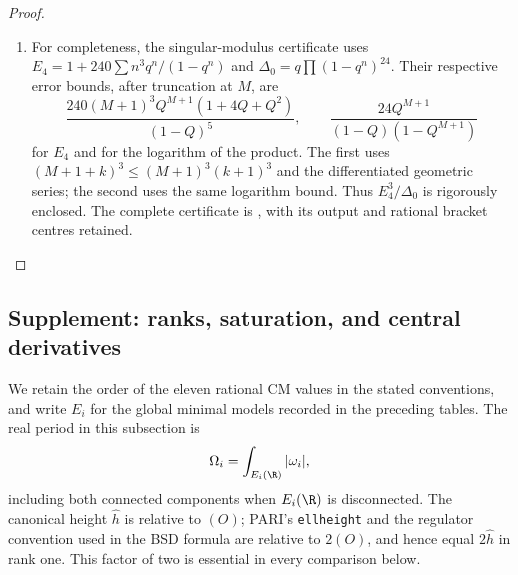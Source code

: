 \begin{proof}
\begin{enumerate}[label=\arabic*.,leftmargin=*]
\item For completeness, the singular-modulus certificate uses
$E_4=1+240\sum n^3q^n/(1-q^n)$ and
$\Delta_0=q\prod(1-q^n)^{24}$. Their respective error
bounds, after truncation at $M$, are
\[
 \frac{240(M+1)^3Q^{M+1}(1+4Q+Q^2)}{(1-Q)^5},
 \qquad
 \frac{24Q^{M+1}}{(1-Q)(1-Q^{M+1})}
\]
for $E_4$ and for the logarithm of the product. The first
uses $(M+1+k)^3\le(M+1)^3(k+1)^3$ and the differentiated
geometric series; the second uses the same logarithm bound.
Thus $E_4^3/\Delta_0$ is rigorously enclosed. The complete
certificate is , with its
output and rational bracket centres retained.
\end{enumerate}
\end{proof}


\subsection{Supplement: ranks, saturation, and central derivatives}

We retain the order of the eleven rational CM values in the stated conventions, and
write $E_i$ for the global minimal models recorded in the preceding
tables. The real period in this subsection is
\[
 \Omega_i=\int_{E_i(\R)}|\omega_i|,
\]
including both connected components when $E_i(\R)$ is disconnected.
The canonical height $\widehat h$ is relative to $(O)$; PARI's
\texttt{ellheight} and the regulator convention used in the BSD formula
are relative to $2(O)$, and hence equal $2\widehat h$ in rank one.
This factor of two is essential in every comparison below.

